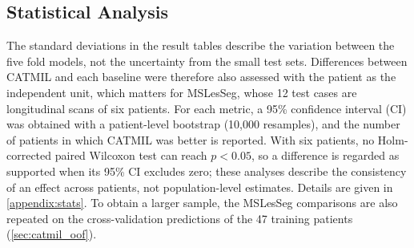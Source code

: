 \subsection{Statistical Analysis}
\label{sec:stats}

The standard deviations in the result tables describe the variation
between the five fold models, not the uncertainty from the small test sets.
Differences between CATMIL and each baseline were therefore also assessed
with the patient as the independent unit, which matters for MSLesSeg, whose
12 test cases are longitudinal scans of six patients. For each metric, a
95\% confidence interval (CI) was obtained with a patient-level bootstrap
(10{,}000 resamples), and the number of patients in which CATMIL was better
is reported. With six patients, no Holm-corrected paired Wilcoxon test can
reach $p < 0.05$, so a difference is regarded as supported when its 95\%
CI excludes zero; these analyses describe the consistency of an effect
across patients, not population-level estimates. Details are given in
\cref{appendix:stats}. To obtain a larger sample, the MSLesSeg comparisons
are also repeated on the cross-validation predictions of the 47 training
patients (\cref{sec:catmil_oof}).
